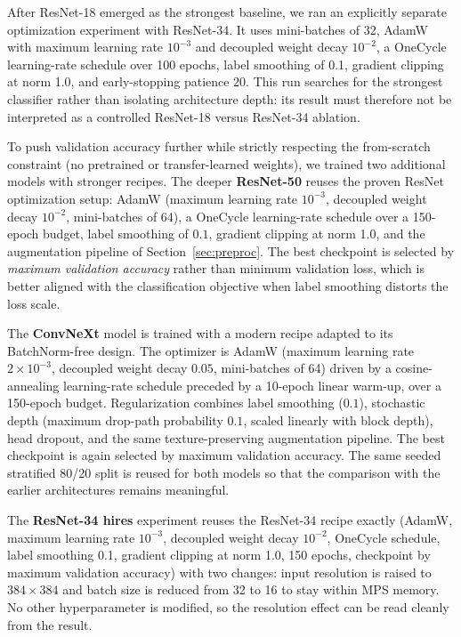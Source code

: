 \documentclass{name}
\begin{document}
After ResNet-18 emerged as the strongest baseline, we ran an explicitly separate optimization experiment with ResNet-34. It uses mini-batches of 32, AdamW with maximum learning rate $10^{-3}$ and decoupled weight decay $10^{-2}$, a OneCycle learning-rate schedule over 100 epochs, label smoothing of 0.1, gradient clipping at norm 1.0, and early-stopping patience 20. This run searches for the strongest classifier rather than isolating architecture depth: its result must therefore not be interpreted as a controlled ResNet-18 versus ResNet-34 ablation.

To push validation accuracy further while strictly respecting the from-scratch constraint (no pretrained or transfer-learned weights), we trained two additional models with stronger recipes. The deeper \textbf{ResNet-50} reuses the proven ResNet optimization setup: AdamW (maximum learning rate $10^{-3}$, decoupled weight decay $10^{-2}$, mini-batches of 64), a OneCycle learning-rate schedule over a 150-epoch budget, label smoothing of $0.1$, gradient clipping at norm 1.0, and the augmentation pipeline of Section~\ref{sec:preproc}. The best checkpoint is selected by \emph{maximum validation accuracy} rather than minimum validation loss, which is better aligned with the classification objective when label smoothing distorts the loss scale.

The \textbf{ConvNeXt} model is trained with a modern recipe adapted to its BatchNorm-free design. The optimizer is AdamW (maximum learning rate $2 \times 10^{-3}$, decoupled weight decay $0.05$, mini-batches of 64) driven by a cosine-annealing learning-rate schedule preceded by a 10-epoch linear warm-up, over a 150-epoch budget. Regularization combines label smoothing ($0.1$), stochastic depth (maximum drop-path probability $0.1$, scaled linearly with block depth), head dropout, and the same texture-preserving augmentation pipeline. The best checkpoint is again selected by maximum validation accuracy. The same seeded stratified 80/20 split is reused for both models so that the comparison with the earlier architectures remains meaningful.

The \textbf{ResNet-34 hires} experiment reuses the ResNet-34 recipe exactly (AdamW, maximum learning rate $10^{-3}$, decoupled weight decay $10^{-2}$, OneCycle schedule, label smoothing 0.1, gradient clipping at norm 1.0, 150 epochs, checkpoint by maximum validation accuracy) with two changes: input resolution is raised to $384\times384$ and batch size is reduced from 32 to 16 to stay within MPS memory. No other hyperparameter is modified, so the resolution effect can be read cleanly from the result.
\end{document}
